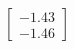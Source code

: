 \documentclass[preview]{standalone}
\begin{document}
\begin{align*}
\begin{bmatrix} -1.43 \\ -1.46 \end{bmatrix}
\end{align*}
\end{document}
